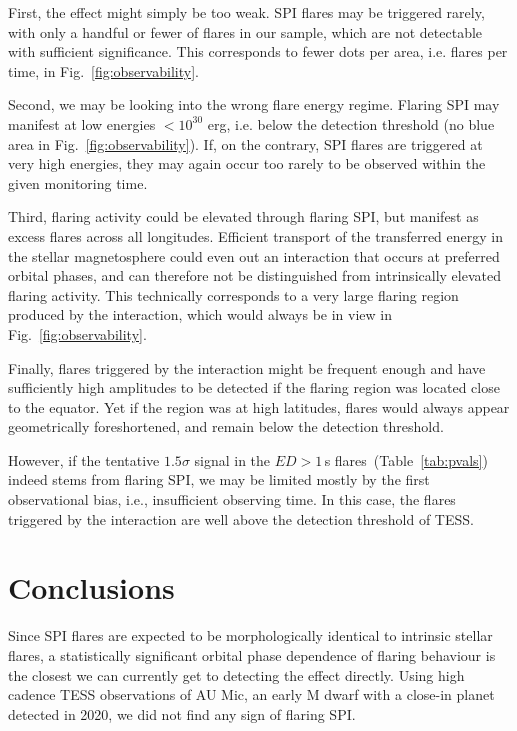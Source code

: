 \documentclass[fleqn,usenatbib]{mnras}%
\begin{document}
First, the effect might simply be too weak. SPI flares may be triggered rarely, with only a handful or fewer of flares in our sample, which are not detectable with sufficient significance. This corresponds to fewer dots per area, i.e. flares per time, in Fig.~\ref{fig:observability}.

Second, we may be looking into the wrong flare energy regime. Flaring SPI may manifest at low energies $<10^{30}$ erg, i.e. below the detection threshold (no blue area in Fig.~\ref{fig:observability}). If, on the contrary, SPI flares are triggered at very high energies, they may again occur too rarely to be observed within the given monitoring time. 

Third, flaring activity could be elevated through flaring SPI, but manifest as excess flares across all longitudes. Efficient transport of the transferred energy in the stellar magnetosphere could even out an interaction that occurs at preferred orbital phases, and can therefore not be distinguished from intrinsically elevated flaring activity. This technically corresponds to a very large flaring region produced by the interaction, which would always be in view in Fig.~\ref{fig:observability}.

Finally, flares triggered by the interaction might be frequent enough and have sufficiently high amplitudes to be detected if the flaring region was located close to the equator. Yet if the region was at high latitudes, flares would always appear geometrically foreshortened, and remain below the detection threshold.

However, if the tentative $1.5\sigma$ signal in the $ED>1$\,s flares~(Table~\ref{tab:pvals}) indeed stems from flaring SPI, we may be limited mostly by the first observational bias, i.e., insufficient observing time. In this case, the flares triggered by the interaction are well above the detection threshold of TESS.

\section{Conclusions}
\label{sec:conclusions}
Since SPI flares are expected to be morphologically identical to intrinsic stellar flares, a statistically significant orbital phase dependence of flaring behaviour is the closest we can currently get to detecting the effect directly. Using high cadence TESS observations of AU Mic, an early M dwarf with a close-in planet detected in 2020, we did not find any sign of flaring SPI.
\end{document}
